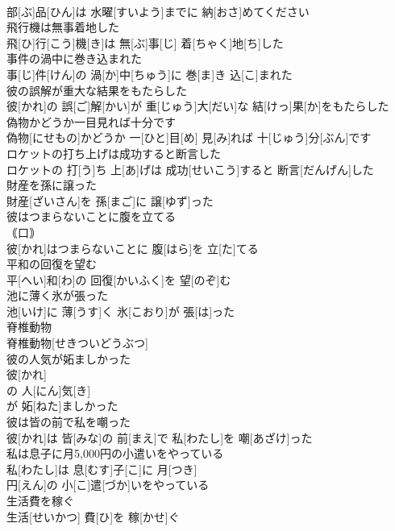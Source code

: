 \documentclass[8pt]{extreport}
\begin{document}
\begin{CJK}{UTF8}{min}
\\	部[ぶ]品[ひん]は 水曜[すいよう]までに 納[おさ]めてください
\\	飛行機は無事着地した	
\\	飛[ひ]行[こう]機[き]は 無[ぶ]事[じ] 着[ちゃく]地[ち]した
\\	事件の渦中に巻き込まれた	
\\	事[じ]件[けん]の 渦[か]中[ちゅう]に 巻[ま]き 込[こ]まれた
\\	彼の誤解が重大な結果をもたらした	
\\	彼[かれ]の 誤[ご]解[かい]が 重[じゅう]大[だい]な 結[けっ]果[か]をもたらした
\\	偽物かどうか一目見れば十分です	
\\	偽物[にせもの]かどうか 一[ひと]目[め] 見[み]れば 十[じゅう]分[ぶん]です
\\	ロケットの打ち上げは成功すると断言した	
\\	ロケットの 打[う]ち 上[あ]げは 成功[せいこう]すると 断言[だんげん]した
\\	財産を孫に譲った	
\\	財産[ざいさん]を 孫[まご]に 譲[ゆず]った
\\	彼はつまらないことに腹を立てる	
\\	｟口｠
\\	彼[かれ]はつまらないことに 腹[はら]を 立[た]てる
\\	平和の回復を望む	
\\	平[へい]和[わ]の 回復[かいふく]を 望[のぞ]む
\\	池に薄く氷が張った	
\\	池[いけ]に 薄[うす]く 氷[こおり]が 張[は]った
\\	脊椎動物	
\\	脊椎動物[せきついどうぶつ]
\\	彼の人気が妬ましかった	
\\	彼[かれ]
\\	の 人[にん]気[き]
\\	が 妬[ねた]ましかった 
\\	彼は皆の前で私を嘲った	
\\	彼[かれ]は 皆[みな]の 前[まえ]で 私[わたし]を 嘲[あざけ]った
\\	私は息子に月5,000円の小遣いをやっている	
\\	私[わたし]は 息[むす]子[こ]に 月[つき] 
\\	円[えん]の 小[こ]遣[づか]いをやっている
\\	生活費を稼ぐ	
\\	生活[せいかつ] 費[ひ]を 稼[かせ]ぐ

\end{CJK}
\end{document}
